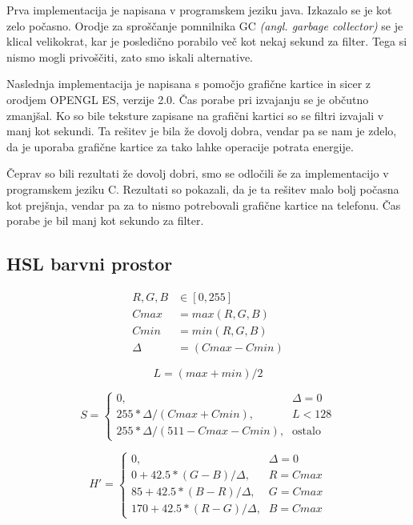 Prva implementacija je napisana v programskem jeziku java. Izkazalo se je kot
zelo počasno. Orodje za sproščanje pomnilnika GC \textit{(angl. garbage
collector)} se je klical velikokrat, kar je posledično porabilo več kot nekaj
sekund za filter. Tega si nismo mogli privoščiti, zato smo iskali alternative.

Naslednja implementacija je napisana s pomočjo grafične kartice in sicer z
orodjem OPENGL ES, verzije 2.0. Čas porabe pri izvajanju se je občutno
zmanjšal. Ko so bile teksture zapisane na grafični kartici so se filtri
izvajali v manj kot sekundi. Ta rešitev je bila že dovolj dobra, vendar pa se
nam je zdelo, da je uporaba grafične kartice za tako lahke operacije potrata
energije.

Čeprav so bili rezultati že dovolj dobri, smo se odločili še za implementacijo
v programskem jeziku C. Rezultati so pokazali, da je ta rešitev malo bolj
počasna kot prejšnja, vendar pa za to nismo potrebovali grafične kartice na
telefonu. Čas porabe je bil manj kot sekundo za filter.

\subsection{HSL barvni prostor}
\label{sec:hsl}

\begin{align}
R, G, B &\in [0,255] \nonumber \\
Cmax &= max(R, G, B) \\
Cmin &= min(R, G, B) \\
\Delta &= (Cmax - Cmin)
\end{align}

\begin{equation}
L = (max + min) / 2 \label{eq:hsl_l}
\end{equation}

\begin{equation}
S =
\begin{cases}
    0 \text{,}& \Delta = 0 \\
    255 * \Delta / (Cmax + Cmin) \text{,}& L < 128 \\
    255 * \Delta / (511 - Cmax - Cmin) \text{,}& \text{ostalo}
\end{cases}
\end{equation}

\begin{equation}
H' =
\begin{cases}
    0 \text{,}& \Delta = 0 \\
    0 + 42.5 * (G - B) / \Delta \text{,}& R = Cmax \\
    85 + 42.5 * (B - R) / \Delta \text{,}& G = Cmax \\
    170 + 42.5 * (R - G) / \Delta \text{,}& B = Cmax
\end{cases}
\end{equation}

